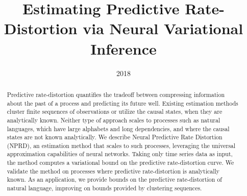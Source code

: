 \documentclass[11pt,letterpaper]{article}
\title{Estimating Predictive Rate-Distortion via Neural Variational Inference}
\date{2018}
\begin{document}
\maketitle


\begin{abstract}
Predictive rate-distortion quantifies the tradeoff between compressing information about the past of a process and predicting its future well.
Existing estimation methods cluster finite sequences of observations or utilize the causal states, when they are analytically known.
Neither type of approach scales to processes such as natural languages, which have large alphabets and long dependencies, and where the causal states are not known analytically.
	We describe Neural Predictive Rate Distortion (NPRD), an estimation method that scales to such processes, leveraging the universal approximation capabilities of neural networks.
Taking only time series data as input, the method computes a variational bound on the predictive rate-distortion curve.
We validate the method on processes where predictive rate-distortion is analytically known.
As an application, we provide bounds on the predictive rate-distortion of natural language, improving on bounds provided by clustering sequences.
\end{abstract}


%
\end{document}
